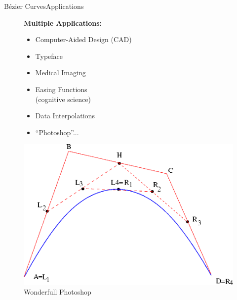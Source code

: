 \documentclass[10pt]{beamer}
\begin{document}
\begin{frame}[noframenumbering]{Bézier Curves}{Applications}

  \begin{figure}[H]

    \vspace{1cm}
    \hspace{-4cm}
    \begin{minipage}{0.70\linewidth}
      \textbf{Multiple Applications:}
      \begin{itemize}
      \item Computer-Aided Design (CAD) 
      \item Typeface 
      \item Medical Imaging 
      \item Easing Functions\\ (cognitive science) 
      \item Data Interpolations 
      \item ``Photoshop''... 
      \end{itemize}
    \end{minipage}

    \hspace{5cm}
    \begin{minipage}{0.50\linewidth}
        \vspace{-4cm}
        \includegraphics[scale=0.4]{curve.png}
        \begin{center}
        \caption{Wonderfull Photoshop\footnotemark[1]}
        \end{center}
    
  \end{minipage}
  
\end{figure}
\vspace{-0.5cm}
\begin{overprint}

 
  
\end{overprint}
\end{frame}
\end{document}
